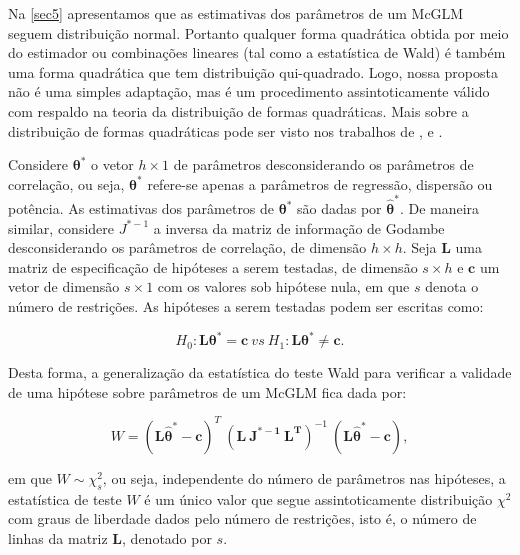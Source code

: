 \documentclass[AMA,STIX1COL]{WileyNJD-v2}
\begin{document}
Na \autoref{sec5} apresentamos que as estimativas dos parâmetros de um McGLM seguem distribuição normal. Portanto qualquer forma quadrática obtida por meio do estimador ou combinações lineares (tal como a estatística de Wald) é também uma forma quadrática que tem distribuição qui-quadrado. Logo, nossa proposta não é uma simples adaptação, mas é um procedimento assintoticamente válido com respaldo na teoria da distribuição de formas quadráticas. Mais sobre a distribuição de formas quadráticas pode ser visto nos trabalhos de \cite{graybill1957idempotent}, \cite{luther1965decomposition} e \cite{baldessari1967distribution}.


Considere $\boldsymbol{\theta^{*}}$ o vetor $h \times 1$ de parâmetros desconsiderando os parâmetros de correlação, ou seja, $\boldsymbol{\theta^{*}}$ refere-se apenas a parâmetros de regressão, dispersão ou potência. As estimativas dos parâmetros de $\boldsymbol{\theta^{*}}$ são dadas por $\boldsymbol{\hat\theta^{*}}$. De maneira similar, considere $J^{\boldsymbol{*}-1}$ a inversa da matriz de informação de Godambe desconsiderando os parâmetros de correlação, de dimensão $h \times h$. Seja $\boldsymbol{L}$ uma matriz de especificação de hipóteses a serem testadas, de dimensão $s \times h$ e $\boldsymbol{c}$ um vetor de dimensão $s \times 1$ com os valores sob hipótese nula, em que $s$ denota o número de restrições. As hipóteses a serem testadas podem ser escritas como:

\begin{equation}
\label{eq:hipoteses_wald}
H_0: \boldsymbol{L}\boldsymbol{\theta^{*}} = \boldsymbol{c} \ vs \ H_1: \boldsymbol{L}\boldsymbol{\theta^{*}} \neq \boldsymbol{c}. 
\end{equation}

\noindent Desta forma, a generalização da estatística do teste Wald para verificar a validade de uma hipótese sobre parâmetros de um McGLM fica dada por:

$$
W = (\boldsymbol{L\hat\theta^{*}} - \boldsymbol{c})^T \ (\boldsymbol{L \ J^{\boldsymbol{*}-1} \ L^T})^{-1} \ (\boldsymbol{L\hat\theta^{*}} - \boldsymbol{c}),
$$

\noindent em que $W \sim \chi^2_s$, ou seja, independente do número de parâmetros nas hipóteses, a estatística de teste $W$ é um único valor que segue assintoticamente distribuição $\chi^2$ com graus de liberdade dados pelo número de restrições, isto é, o número de linhas da matriz $\boldsymbol{L}$, denotado por $s$.
\end{document}
